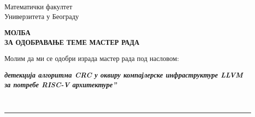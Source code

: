 \documentclass[a4paper]{article}
\def\zn{,\kern-0.09em,}
\begin{document}
\thispagestyle{empty}

\begin{flushleft}
Математички факултет\\
Универзитета у Београду
\end{flushleft}

\bigskip

\begin{center}
\textbf{МОЛБА\\
ЗА ОДОБРАВАЊЕ ТЕМЕ МАСТЕР РАДА
}\end{center}

\bigskip

\begin{flushleft}
Молим да ми се одобри израда мастер рада под насловом:
\end{flushleft}

\begin{minipage}{16.5cm}
\textbf{\textit{ детекција алгоритма CRC у оквиру компајлерске инфраструктуре LLVM за потребе RISC-V архитектуре''}}
\end{minipage}\\
\rule[4mm]{17.5cm}{.05mm}
\end{document}

